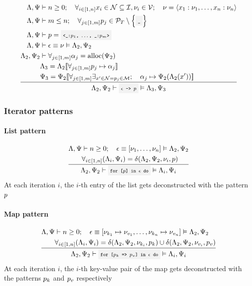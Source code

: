\[
	\oprule[aligned]{
		\EnvLoc,\EnvStore       &\then n \geq 0 \semiq \forall_{i\in[1,n]}{x_i\in\mathcal{N}\subseteq\Id, \val_i\in\Val} \semiq \val = \tuple{x_1:\val_1,\dotsc,x_n:\val_n} \\*
		\EnvLoc,\EnvStore       &\then m \leq n \semiq \forall_{j\in[1,m]}{\pattern_j\in\PatternTerminal\setminus\set{\code{\_}}} \\*
		\EnvLoc,\EnvStore       &\then \pattern = \code{<\_:$\pattern_1$, $\dotsc$, \_:$\pattern_m$>} \\*
		\EnvLoc,\EnvStore       &\then \expr \eval \val \Then \EnvLoc_2,\EnvStore_2 \\*
		\EnvLoc_2,\EnvStore_2   &\then \forall_{j\in[1,m]}{\addr_j = \alloc(\EnvStore_2)} \\*
		                        &\EnvLoc_3   = \EnvLoc_2\env{\forall_{j\in[1,m]}{\pattern_j\mapsto\addr_j}}\\*
		                        &\EnvStore_3 = \EnvStore_2\env{\forall_{j\in[1,m]}{\exists_{x'\in\mathcal{N}=\pattern_j\in\mathcal{M}}{\semiq\addr_j\mapsto\EnvStore_2(\EnvLoc_2(x'))}}}\\*
	}{
		\EnvLoc_2,\EnvStore_2 \then \code{$\expr$ -> $\pattern$} \Then \EnvLoc_3,\EnvStore_3\\*
	}
\]

\subsubsection{Iterator patterns}

\paragraph{List pattern}

\[
	\oprule[aligned]{
		\EnvLoc,\EnvStore &\then n \geq 0 \semiq \expr\eval\glist{\val_1,\dotsc,\val_n} \Then \EnvLoc_2,\EnvStore_2 \\*
						  &\forall_{i\in[1,n]}{(\EnvLoc_i,\EnvStore_i) = \decons(\EnvLoc_2,\EnvStore_2,\val_i,\pattern)}
	}{
		\EnvLoc_2,\EnvStore_2 \then \code{for [$\pattern$] in $\expr$ do} \Then \EnvLoc_i,\EnvStore_i\\*
	}
\]
At each iteration $i$, the $i$-th entry of the list gets deconstructed with
the pattern $p$


\paragraph{Map pattern}

\[
	\oprule[aligned]{
		\EnvLoc,\EnvStore &\then n \geq 0 \semiq \expr\eval\map{\val_{k_1}\mapsto\val_{v_1},\dotsc,\val_{k_n}\mapsto\val_{v_n}} \Then \EnvLoc_2,\EnvStore_2 \\*
						  &\forall_{i\in[1,n]}{(\EnvLoc_i,\EnvStore_i) = \decons(\EnvLoc_2,\EnvStore_2,\val_{k_i},\pattern_k)} \cup \decons(\EnvLoc_2,\EnvStore_2,\val_{v_i},\pattern_v)
	}{
		\EnvLoc_2,\EnvStore_2 \then \code{for [$\pattern_k$ => $\pattern_v$] in $\expr$ do} \Then \EnvLoc_i,\EnvStore_i\\*
	}
\]
At each iteration $i$, the $i$-th key-value pair of the map gets deconstructed
with the patterns $p_k$ and $p_v$ respectively

